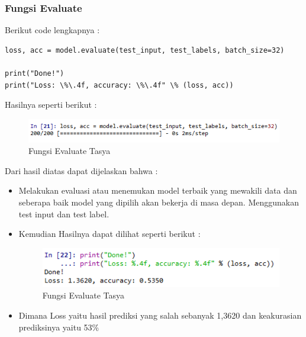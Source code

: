 \subsubsection{Fungsi Evaluate}
Berikut code lengkapnya :
\begin{verbatim}
loss, acc = model.evaluate(test_input, test_labels, batch_size=32)

print("Done!")
print("Loss: \%\.4f, accuracy: \%\.4f" \% (loss, acc))
\end{verbatim}
Hasilnya seperti berikut :\\
\begin{figure}[ht]
\centering
\includegraphics[scale=0.5]{figures/chapter6tasya20.png}
\caption{Fungsi Evaluate Tasya}
\label{Praktek}
\end{figure}
Dari hasil diatas dapat dijelaskan bahwa :\\
\begin{itemize}
\item Melakukan evaluasi atau  menemukan model terbaik yang mewakili data dan seberapa baik model yang dipilih akan bekerja di masa depan. Menggunakan test input dan test label.
\item Kemudian Hasilnya dapat dilihat seperti berikut :
\begin{figure}[ht]
\centering
\includegraphics[scale=0.5]{figures/chapter6tasya21.png}
\caption{Fungsi Evaluate Tasya}
\label{Praktek}
\end{figure}
\item Dimana Loss yaitu hasil prediksi yang salah sebanyak 1,3620 dan keakurasian prediksinya yaitu 53\%
\end{itemize}

